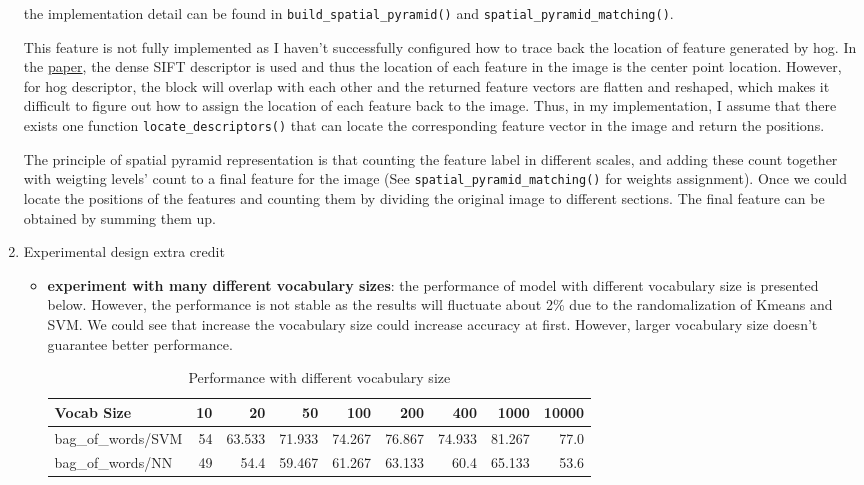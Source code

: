 \begin{enumerate}
    the implementation detail can be found in \verb|build_spatial_pyramid()| and \verb|spatial_pyramid_matching()|.

    This feature is not fully implemented as I haven't successfully configured how to trace back the location of feature generated by hog. In the \hyperlink{https://inc.ucsd.edu/~marni/Igert/Lazebnik_06.pdf}{paper}, the dense SIFT descriptor is used and thus the location of each feature in the image is the center point location. However, for hog descriptor, the block will overlap with each other and the returned feature vectors are flatten and reshaped, which makes it difficult to figure out how to assign the location of each feature back to the image. Thus, in my implementation, I assume that there exists one function \verb|locate_descriptors()| that can locate the corresponding feature vector in the image and return the positions.
    
    The principle of spatial pyramid representation is that counting the feature label in different scales, and adding these count together with weigting levels' count to a final feature for the image (See \verb|spatial_pyramid_matching()| for weights assignment). Once we could locate the positions of the features and counting them by dividing the original image to different sections. The final feature can be obtained by summing them up.

    \item Experimental design extra credit
          \begin{itemize}
              \item \textbf{experiment with many different vocabulary sizes}: the performance of model with different vocabulary size is presented below. However, the performance is not stable as the results will fluctuate about 2\% due to the randomalization of Kmeans and SVM. We could see that increase the vocabulary size could increase accuracy at first. However, larger vocabulary size doesn't guarantee better performance.
                    \begin{table}[h]
                        \centering
                        \begin{tabular}{lrrrrrrrr}
                            \toprule
                            Vocab Size         & 10 & 20     & 50     & 100    & 200    & 400    & 1000   & 10000 \\
                            \midrule
                            bag\_of\_words/SVM & 54 & 63.533 & 71.933 & 74.267 & 76.867 & 74.933 & 81.267 & 77.0  \\
                            bag\_of\_words/NN  & 49 & 54.4   & 59.467 & 61.267 & 63.133 & 60.4   & 65.133 & 53.6  \\
                            \bottomrule
                        \end{tabular}
                        \caption{Performance with different vocabulary size}
                        \label{svm}
                    \end{table}


\end{itemize}
\end{enumerate}

